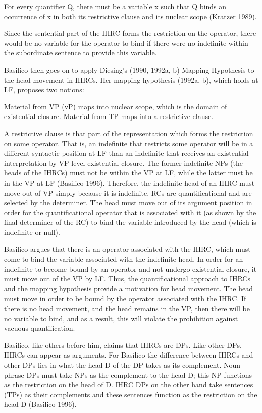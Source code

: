 \documentclass[output=paper]{LSP/langsci}
\begin{document}
\ea For every quantifier Q, there must be a variable x such that Q binds an occurrence of x in both its restrictive clause and its nuclear scope (Kratzer 1989). \label{boyle44} 
\z

Since the sentential part of the IHRC forms the restriction on the operator, there would be no variable for the operator to bind if there were no indefinite within the subordinate sentence to provide this variable.

Basilico then goes on to apply Diesing's (1990, 1992a, b) Mapping Hypothesis to the head movement in IHRCs. Her mapping hypothesis (1992a, b), which holds at LF, proposes two notions:

\ea \label{boyle45}
\begin{xlist}
\ex Material from VP (vP) maps into nuclear scope, which is the domain of existential closure.
\ex Material from TP maps into a restrictive clause.
\end{xlist}
\z
 
A restrictive clause is that part of the representation which forms the restriction on some operator. That is, an indefinite that restricts some operator will be in a different syntactic position at LF than an indefinite that receives an existential interpretation by VP-level existential closure. The former indefinite NPs (the heads of the IHRCs) must not be within the VP at LF, while the latter must be in the VP at LF (Basilico 1996). Therefore, the indefinite head of an IHRC must move out of VP simply because it is indefinite. RCs are quantificational and are selected by the determiner. The head must move out of its argument position in order for the quantificational operator that is associated with it (as shown by the final determiner of the RC) to bind the variable introduced by the head (which is indefinite or null).   
	
Basilico argues that there is an operator associated with the IHRC, which must come to bind the variable associated with the indefinite head. In order for an indefinite to become bound by an operator and not undergo existential closure, it must move out of the VP by LF. Thus, the quantificational approach to IHRCs and the mapping hypothesis provide a motivation for head movement. The head must move in order to be bound by the operator associated with the IHRC. If there is no head movement, and the head remains in the VP, then there will be no variable to bind, and as a result, this will violate the prohibition against vacuous quantification.  
	
Basilico, like others before him, claims that IHRCs are DPs. Like other DPs, IHRCs can appear as arguments. For Basilico the difference between IHRCs and other DPs lies in what the head D of the DP takes as its complement. Noun phrase DPs must take NPs as the complement to the head D; this NP functions as the restriction on the head of D. IHRC DPs on the other hand take sentences (TPs) as their complements and these sentences function as the restriction on the head D (Basilico 1996). 
	
\end{document}
